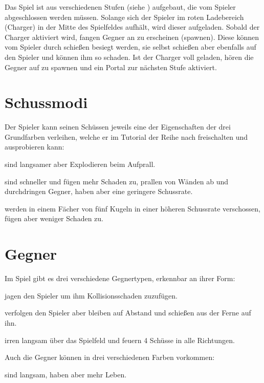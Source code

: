 \documentclass[a4paper,10pt,ngerman,fontsize=12pt]{scrreprt}
\begin{document}
Das Spiel ist aus verschiedenen Stufen (siehe ) aufgebaut, die vom Spieler abgeschlossen werden müssen.
Solange sich der Spieler im roten Ladebereich (Charger) in der Mitte des Spielfeldes aufhält, wird dieser aufgeladen.
Sobald der Charger aktiviert wird, fangen Gegner an zu erscheinen (spawnen). Diese können vom Spieler durch schie{\ss}en besiegt werden, sie selbst schie{\ss}en aber ebenfalls auf den Spieler und können ihm so schaden.
Ist der Charger voll geladen, hören die Gegner auf zu spawnen und ein Portal zur nächsten Stufe aktiviert.




\section{Schussmodi}

Der Spieler kann seinen Schüssen jeweils eine der Eigenschaften der drei Grundfarben verleihen, welche er im Tutorial der Reihe nach freischalten und ausprobieren kann:

\renewcommand{\itmspace}{4.5em}
{sind langsamer aber Explodieren beim Aufprall.}

{sind schneller und fügen mehr Schaden zu, prallen von Wänden ab und durchdringen Gegner, haben aber eine geringere Schussrate.}

{werden in einem Fächer von fünf Kugeln in einer höheren Schussrate verschossen, fügen aber weniger Schaden zu.}




\section{Gegner}

Im Spiel gibt es drei verschiedene Gegnertypen, erkennbar an ihrer Form:

\renewcommand{\itmspace}{4.5em}
{jagen den Spieler um ihm Kollisionsschaden zuzufügen.}

{verfolgen den Spieler aber bleiben auf Abstand und schie{\ss}en aus der Ferne auf ihn.}

{irren langsam über das Spielfeld und feuern 4 Schüsse in alle Richtungen.}

Auch die Gegner können in drei verschiedenen Farben vorkommen:

\renewcommand{\itmspace}{7.5em}
{sind langsam, haben aber mehr Leben.}
\end{document}
